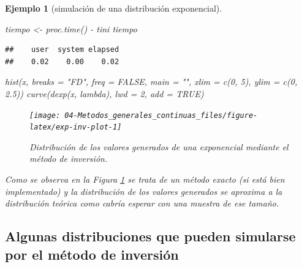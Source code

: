 \documentclass[
]{book}
\newenvironment{Shaded}{\begin{snugshade}}{\end{snugshade}}
\newcommand{\AttributeTok}[1]{\textcolor[rgb]{0.77,0.63,0.00}{#1}}
\newcommand{\ConstantTok}[1]{\textcolor[rgb]{0.00,0.00,0.00}{#1}}
\newcommand{\DecValTok}[1]{\textcolor[rgb]{0.00,0.00,0.81}{#1}}
\newcommand{\FloatTok}[1]{\textcolor[rgb]{0.00,0.00,0.81}{#1}}
\newcommand{\FunctionTok}[1]{\textcolor[rgb]{0.00,0.00,0.00}{#1}}
\newcommand{\NormalTok}[1]{#1}
\newcommand{\OtherTok}[1]{\textcolor[rgb]{0.56,0.35,0.01}{#1}}
\newcommand{\SpecialCharTok}[1]{\textcolor[rgb]{0.00,0.00,0.00}{#1}}
\newcommand{\StringTok}[1]{\textcolor[rgb]{0.31,0.60,0.02}{#1}}
\theoremstyle{break}
\newtheorem{example}{Ejemplo}[chapter]
\theoremstyle{nonumberplain}
\begin{document}
\begin{example}[simulación de una distribución exponencial]
\begin{Shaded}
\begin{Highlighting}[]
\NormalTok{tiempo }\OtherTok{\textless{}{-}} \FunctionTok{proc.time}\NormalTok{() }\SpecialCharTok{{-}}\NormalTok{ tini}
\NormalTok{tiempo}
\end{Highlighting}
\end{Shaded}

\begin{verbatim}
##    user  system elapsed 
##    0.02    0.00    0.02
\end{verbatim}

\begin{Shaded}
\begin{Highlighting}[]
\FunctionTok{hist}\NormalTok{(x, }\AttributeTok{breaks =} \StringTok{"FD"}\NormalTok{, }\AttributeTok{freq =} \ConstantTok{FALSE}\NormalTok{, }
        \AttributeTok{main =} \StringTok{""}\NormalTok{, }\AttributeTok{xlim =} \FunctionTok{c}\NormalTok{(}\DecValTok{0}\NormalTok{, }\DecValTok{5}\NormalTok{), }\AttributeTok{ylim =} \FunctionTok{c}\NormalTok{(}\DecValTok{0}\NormalTok{, }\FloatTok{2.5}\NormalTok{))}
\FunctionTok{curve}\NormalTok{(}\FunctionTok{dexp}\NormalTok{(x, lambda), }\AttributeTok{lwd =} \DecValTok{2}\NormalTok{, }\AttributeTok{add =} \ConstantTok{TRUE}\NormalTok{)}
\end{Highlighting}
\end{Shaded}

\begin{figure}[!htb]

{\centering \texttt{[image: 04-Metodos\_generales\_continuas\_files/figure-latex/exp-inv-plot-1]} 

}

\caption{Distribución de los valores generados de una exponencial mediante el método de inversión.}\label{fig:exp-inv-plot}
\end{figure}

Como se observa en la Figura \ref{fig:exp-inv-plot} se trata de un método exacto (si está bien implementado) y la distribución de los valores generados se aproxima a la distribución teórica como cabría esperar con una muestra de ese tamaño.
\end{example}

\hypertarget{algunas-distribuciones-que-pueden-simularse-por-el-muxe9todo-de-inversiuxf3n}{%
\subsection{Algunas distribuciones que pueden simularse por el método de inversión}\label{algunas-distribuciones-que-pueden-simularse-por-el-muxe9todo-de-inversiuxf3n}}
\end{document}
